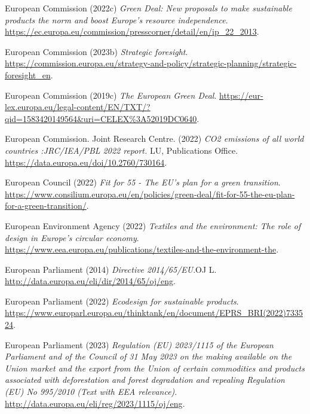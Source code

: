 \documentclass[
  letterpaper,
  DIV=11,
  numbers=noendperiod]{scrartcl}
\newlength{\cslhangindent}
\newenvironment{CSLReferences}[2] %
 {\begin{list}{}{%
  \setlength{\itemindent}{0pt}
  \setlength{\leftmargin}{0pt}
  \setlength{\parsep}{0pt}
  \ifodd #1
   \setlength{\leftmargin}{\cslhangindent}
   \setlength{\itemindent}{-1\cslhangindent}
  \fi
  \setlength{\itemsep}{#2\baselineskip}}}
 {\end{list}}
\begin{document}
\begin{CSLReferences}{0}{1}
European Commission (2022c) \emph{Green {Deal}: {New} proposals to make
sustainable products the norm and boost {Europe}'s resource
independence}.
\url{https://ec.europa.eu/commission/presscorner/detail/en/ip_22_2013}.

European Commission (2023b) \emph{Strategic foresight}.
\url{https://commission.europa.eu/strategy-and-policy/strategic-planning/strategic-foresight_en}.

European Commission (2019c) \emph{The {European Green Deal}}.
\url{https://eur-lex.europa.eu/legal-content/EN/TXT/?qid=1583420149564&uri=CELEX\%3A52019DC0640}.

European Commission. Joint Research Centre. (2022) \emph{{CO2} emissions
of all world countries :{JRC}/{IEA}/{PBL} 2022 report.} LU, Publications
Office. \url{https://data.europa.eu/doi/10.2760/730164}.

European Council (2022) \emph{Fit for 55 - {The EU}'s plan for a green
transition}.
\url{https://www.consilium.europa.eu/en/policies/green-deal/fit-for-55-the-eu-plan-for-a-green-transition/}.

European Environment Agency (2022) \emph{Textiles and the environment:
The role of design in {Europe}'s circular economy}.
\url{https://www.eea.europa.eu/publications/textiles-and-the-environment-the}.

European Parliament (2014) \emph{Directive 2014/65/{EU}}.OJ L.
\url{http://data.europa.eu/eli/dir/2014/65/oj/eng}.

European Parliament (2022) \emph{Ecodesign for sustainable products}.
\url{https://www.europarl.europa.eu/thinktank/en/document/EPRS_BRI(2022)733524}.

European Parliament (2023) \emph{Regulation ({EU}) 2023/1115 of the
{European Parliament} and of the {Council} of 31 {May} 2023 on the
making available on the {Union} market and the export from the {Union}
of certain commodities and products associated with deforestation and
forest degradation and repealing {Regulation} ({EU}) {No} 995/2010
({Text} with {EEA} relevance)}.
\url{http://data.europa.eu/eli/reg/2023/1115/oj/eng}.


\end{CSLReferences}
\end{document}
